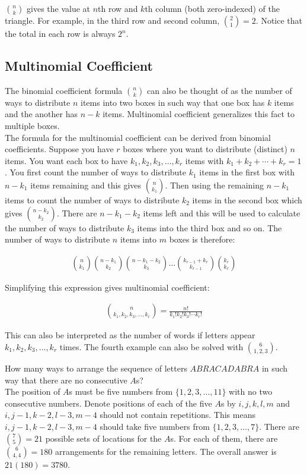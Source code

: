 \documentclass[12pt, a4paper]{article}
\newcounter{exa}
\begin{document}
$\binom{n}{k}$ gives the value at $n$th row and $k$th column (both zero-indexed) of the triangle. For example, in the third row and second column, $\binom{2}{1}=2$. Notice that the total in each row is always $2^n$.

\subsection{Multinomial Coefficient}

The binomial coefficient formula $\binom{n}{k}$ can also be thought of as the number of ways to distribute $n$ items into two boxes in such way that one box has $k$ items and the another has $n-k$ items. Multinomial coefficient generalizes this fact to multiple boxes. \\

The formula for the multinomial coefficient can be derived from binomial coefficients. Suppose you have $r$ boxes where you want to distribute (distinct) $n$ items. You want each box to have $k_1, k_2, k_3, \dots, k_r$ items with $k_1+k_2+\cdots + k_r=1$. You first count the number of ways to distribute $k_1$ items in the first box with $n-k_1$ items remaining and this gives $\binom{n}{k_1}$. Then using the remaining $n-k_1$ items to count the number of ways to distribute $k_2$ items in the second box which gives $\binom{n-k_2}{k_2}$. There are $n-k_1-k_2$ items left and this will be used to calculate the number of ways to distribute $k_3$ items into the third box and so on. The number of ways to distribute $n$ items into $m$ boxes is therefore:

\begin{align*}
\binom{n}{k_1}\binom{n-k_1}{k_2}\binom{n-k_1-k_2}{k_3}\ldots\binom{k_{r-1}+k_r}{k_{r-1}}\binom{k_r}{k_r}
\end{align*}

Simplifying this expression gives multinomial coefficient:

\begin{align*}
\boxed{\binom{n}{k_1, k_2, k_3, \dots, k_r} = \frac{n!}{k_1! k_2! k_3! \cdots k_r!}}
\end{align*}

This can also be interpreted as the number of words if letters appear $k_1, k_2, k_3, \dots, k_r$ times. The fourth example can also be solved with $\binom{6}{1, 2, 3}$.

\begin{texample}
How many ways to arrange the sequence of letters $ABRACADABRA$ in such way that there are no consecutive $A$s? \\

The position of $A$s must be five numbers from $\{1, 2, 3, \dots, 11\}$ with no two consecutive numbers. Denote positions of each of the five $A$s by $i,j,k,l,m$ and $i, j-1, k-2, l-3, m-4$ should not contain repetitions. This means $i, j-1, k-2, l-3, m-4$ should take five numbers from $\{1, 2, 3, \dots, 7\}$. There are $\binom{7}{5}=21$ possible sets of locations for the $A$s. For each of them, there are $\binom{6}{4,4}=180$ arrangements for the remaining letters. The overall answer is $21(180)=3780$.
\end{texample}
\end{document}
